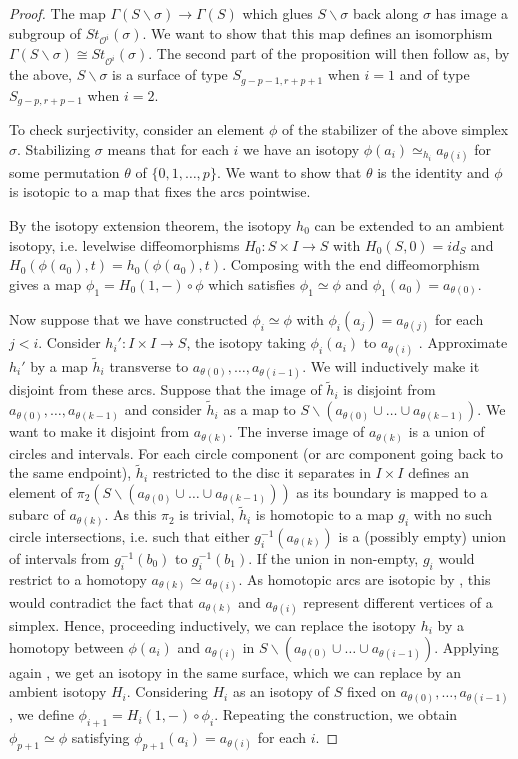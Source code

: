 \documentclass[10pt]{amsart}
\newcommand{\OO}{\mathcal{O}}
\newcommand{\Ga}{\Gamma}
\newcommand{\s}{\sigma}
\newcommand{\minus}{\backslash}
\newcommand{\x}{\times}
\begin{document}
\begin{proof}
\medskip

The map $\Ga(S\minus\s)\to \Ga(S)$ which glues $S\minus \s$ back along $\s$ has image a subgroup of $St_{\OO^i}(\s)$. We want to show that this
map defines an isomorphism  $\Ga(S\minus\s)\cong St_{\OO^i}(\s)$. The second part of the proposition will then follow as, 
by the above, $S\minus\s$ is a surface of type $S_{g-p-1,r+p+1}$ 
when $i=1$ and of type $S_{g-p,r+p-1}$ when $i=2$. 

To check surjectivity, 
consider an element $\phi$ of the stabilizer of the above simplex $\s$. Stabilizing $\s$ means that for each $i$ we have an isotopy 
$\phi(a_i)\simeq_{h_i}a_{\theta(i)}$ for some
permutation $\theta$ of $\{0,1,\dots,p\}$. We want to show that $\theta$ is the identity and $\phi$ is isotopic to a map that fixes 
the arcs pointwise.

By the isotopy extension theorem, the isotopy $h_0$ can be extended to an ambient isotopy, i.e. levelwise diffeomorphisms
 $H_0\colon S\x I\to S$  with $H_0(S,0)=id_S$ and $H_0(\phi(a_0),t)=h_0(\phi(a_0),t)$. Composing with the end diffeomorphism gives a map  
$\phi_1=H_0(1,-)\circ \phi$ which satisfies $\phi_1\simeq \phi$ and $\phi_1(a_0)=a_{\theta(0)}$. 

Now suppose that we have constructed $\phi_i\simeq \phi$ with $\phi_i(a_j)=a_{\theta(j)}$ for each $j<i$. Consider 
$h_i'\colon I\x I\to S$, the isotopy taking $\phi_i(a_i)$ to $a_{\theta(i)}$ . Approximate $h_i'$ by a map $\tilde h_i$ 
transverse to $a_{\theta(0)},\dots,a_{\theta(i-1)}$. We will inductively make it disjoint from these arcs.  
Suppose that the image of $\tilde h_i$ is disjoint from $a_{\theta(0)},\dots,a_{\theta(k-1)}$ and consider $\tilde h_i$ as a map to 
$S\minus(a_{\theta(0)}\cup \dots\cup a_{\theta(k-1)})$. We want to make it disjoint from
$a_{\theta(k)}$. 
The inverse image of $a_{\theta(k)}$ is a union of circles and intervals. For each circle
component (or arc component going back to the same endpoint), $\tilde h_i$ restricted to the disc it separates in $I\x I$ defines
an element of $\pi_2(S\minus(a_{\theta(0)}\cup \dots\cup a_{\theta(k-1)}))$ as its boundary is mapped to a subarc of $a_{\theta(k)}$. As this $\pi_2$ 
is trivial, $\tilde h_i$ is homotopic to a map
$g_i$ with no such circle intersections, i.e. such that either $g_i^{-1}(a_{\theta(k)})$ is a (possibly empty) 
union of intervals from $g_i^{-1}(b_0)$ to $g_i^{-1}(b_1)$. 
If the union in non-empty, $g_i$ would restrict to a homotopy 
$a_{\theta(k)}\simeq a_{\theta(i)}$. As homotopic arcs are isotopic by \cite[Thm 3.1]{Epstein}, this would contradict the fact that $a_{\theta(k)}$
and $a_{\theta(i)}$ represent different vertices of a simplex. 
Hence, proceeding inductively, we can replace the isotopy $h_i$ by a homotopy
between $\phi(a_i)$ and $a_{\theta(i)}$ in  $S\minus(a_{\theta(0)}\cup\dots\cup a_{\theta(i-1)})$. Applying again \cite[Thm 3.1]{Epstein}, 
we get an isotopy in the
same surface, which we can replace by an ambient isotopy $H_i$. Considering $H_i$ as an isotopy of $S$ fixed on
$a_{\theta(0)},\dots,a_{\theta(i-1)}$, we define $\phi_{i+1}=H_i(1,-)\circ \phi_i$.  Repeating the
construction, we obtain $\phi_{p+1}\simeq \phi$ satisfying $\phi_{p+1}(a_i)=a_{\theta(i)}$ for each $i$. 


\end{proof}
\end{document}
